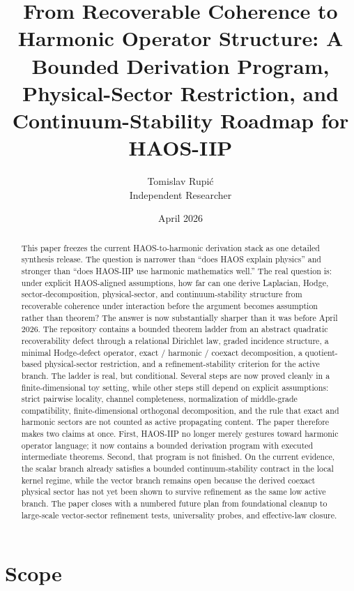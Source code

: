 \documentclass[11pt]{article}
\title{From Recoverable Coherence to Harmonic Operator Structure: A Bounded Derivation Program, Physical-Sector Restriction, and Continuum-Stability Roadmap for HAOS-IIP}
\author{Tomislav Rupi\'c \\ Independent Researcher}
\date{April 2026}
\begin{document}
\maketitle

\begin{abstract}
This paper freezes the current HAOS-to-harmonic derivation stack as one detailed synthesis release. The question is narrower than ``does HAOS explain physics'' and stronger than ``does HAOS-IIP use harmonic mathematics well.'' The real question is: under explicit HAOS-aligned assumptions, how far can one derive Laplacian, Hodge, sector-decomposition, physical-sector, and continuum-stability structure from recoverable coherence under interaction before the argument becomes assumption rather than theorem? The answer is now substantially sharper than it was before April 2026. The repository contains a bounded theorem ladder from an abstract quadratic recoverability defect through a relational Dirichlet law, graded incidence structure, a minimal Hodge-defect operator, exact / harmonic / coexact decomposition, a quotient-based physical-sector restriction, and a refinement-stability criterion for the active branch. The ladder is real, but conditional. Several steps are now proved cleanly in a finite-dimensional toy setting, while other steps still depend on explicit assumptions: strict pairwise locality, channel completeness, normalization of middle-grade compatibility, finite-dimensional orthogonal decomposition, and the rule that exact and harmonic sectors are not counted as active propagating content. The paper therefore makes two claims at once. First, HAOS-IIP no longer merely gestures toward harmonic operator language; it now contains a bounded derivation program with executed intermediate theorems. Second, that program is not finished. On the current evidence, the scalar branch already satisfies a bounded continuum-stability contract in the local kernel regime, while the vector branch remains open because the derived coexact physical sector has not yet been shown to survive refinement as the same low active branch. The paper closes with a numbered future plan from foundational cleanup to large-scale vector-sector refinement tests, universality probes, and effective-law closure.
\end{abstract}

\tableofcontents

\section{Scope}
\end{document}
